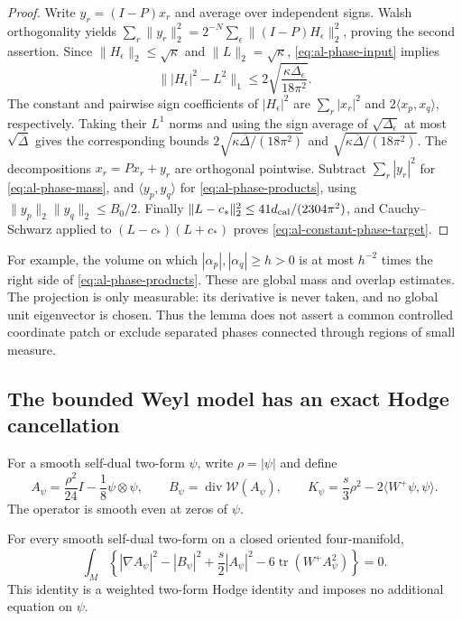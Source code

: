 \begin{proof}
Write $y_r=(I-P)x_r$ and average over independent signs.  Walsh
orthogonality yields
$\sum_r\|y_r\|_2^2=2^{-N}\sum_\epsilon\|(I-P)H_\epsilon\|_2^2$,
proving the second assertion.  Since $\|H_\epsilon\|_2\le\sqrt\kappa$
and $\|L\|_2=\sqrt\kappa$, \eqref{eq:al-phase-input} implies
\[
 \||H_\epsilon|^2-L^2\|_1
 \le2\sqrt{\frac{\kappa\Delta_\epsilon}{18\pi^2}}.
\]
The constant and pairwise sign coefficients of $|H_\epsilon|^2$ are
$\sum_r|x_r|^2$ and $2\langle x_p,x_q\rangle$, respectively.
Taking their $L^1$ norms and using the sign average of
$\sqrt{\Delta_\epsilon}$ at most $\sqrt{\overline\Delta}$ gives
the corresponding bounds $2\sqrt{\kappa\overline\Delta/(18\pi^2)}$
and $\sqrt{\kappa\overline\Delta/(18\pi^2)}$.
The decompositions $x_r=Px_r+y_r$ are orthogonal pointwise.
Subtract $\sum_r|y_r|^2$ for \eqref{eq:al-phase-mass}, and
$\langle y_p,y_q\rangle$ for \eqref{eq:al-phase-products}, using
$\|y_p\|_2\|y_q\|_2\le B_0/2$.
Finally $\|L-c_*\|_2^2\le41d_{\rm cal}/(2304\pi^2)$, and
Cauchy--Schwarz applied to $(L-c_*)(L+c_*)$ proves
\eqref{eq:al-constant-phase-target}.
\end{proof}

For example, the volume on which $|\alpha_p|,|\alpha_q|\ge h>0$
is at most $h^{-2}$ times the right side of
\eqref{eq:al-phase-products}.  These are global mass and overlap
estimates.  The projection is only measurable: its derivative is never
taken, and no global unit eigenvector is chosen.  Thus the lemma does
not assert a common controlled coordinate patch or exclude separated
phases connected through regions of small measure.

\subsection{The bounded Weyl model has an exact Hodge cancellation}

For a smooth self-dual two-form $\psi$, write $\rho=|\psi|$ and define
\begin{equation}\label{eq:al-polynomial-model}
 A_\psi=\frac{\rho^2}{24}I-\frac18\psi\otimes\psi,
 \qquad B_\psi=\operatorname{div}\mathcal W(A_\psi),
 \qquad K_\psi=\frac{s}{3}\rho^2-2\langle W^+\psi,\psi\rangle.
\end{equation}
The operator is smooth even at zeros of $\psi$.

\begin{lemma}\label{lem:al-hodge-cancellation}
For every smooth self-dual two-form on a closed oriented four-manifold,
\begin{equation}\label{eq:al-model-identity}
 \int_M\left\{|\nabla A_\psi|^2-|B_\psi|^2
       +\frac{s}{2}|A_\psi|^2
       -6\operatorname{tr}(W^+A_\psi^2)\right\}=0.
\end{equation}
This identity is a weighted two-form Hodge identity and imposes no
additional equation on $\psi$.
\end{lemma}

